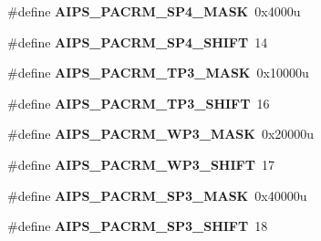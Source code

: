 \begin{DoxyCompactItemize}
\item 
\hypertarget{group___a_i_p_s___register___masks_ga14d029515875232b727e36844ecc8249}{}\#define {\bfseries A\+I\+P\+S\+\_\+\+P\+A\+C\+R\+M\+\_\+\+S\+P4\+\_\+\+M\+A\+S\+K}~0x4000u\label{group___a_i_p_s___register___masks_ga14d029515875232b727e36844ecc8249}

\item 
\hypertarget{group___a_i_p_s___register___masks_ga9fc76b0cb29d106a835ef7905978be39}{}\#define {\bfseries A\+I\+P\+S\+\_\+\+P\+A\+C\+R\+M\+\_\+\+S\+P4\+\_\+\+S\+H\+I\+F\+T}~14\label{group___a_i_p_s___register___masks_ga9fc76b0cb29d106a835ef7905978be39}

\item 
\hypertarget{group___a_i_p_s___register___masks_ga6d28a3c9779892919330279a33555751}{}\#define {\bfseries A\+I\+P\+S\+\_\+\+P\+A\+C\+R\+M\+\_\+\+T\+P3\+\_\+\+M\+A\+S\+K}~0x10000u\label{group___a_i_p_s___register___masks_ga6d28a3c9779892919330279a33555751}

\item 
\hypertarget{group___a_i_p_s___register___masks_gabfa8070a81960bcd605ec46272af76dd}{}\#define {\bfseries A\+I\+P\+S\+\_\+\+P\+A\+C\+R\+M\+\_\+\+T\+P3\+\_\+\+S\+H\+I\+F\+T}~16\label{group___a_i_p_s___register___masks_gabfa8070a81960bcd605ec46272af76dd}

\item 
\hypertarget{group___a_i_p_s___register___masks_gae951389caa46549b62841e9432e83f03}{}\#define {\bfseries A\+I\+P\+S\+\_\+\+P\+A\+C\+R\+M\+\_\+\+W\+P3\+\_\+\+M\+A\+S\+K}~0x20000u\label{group___a_i_p_s___register___masks_gae951389caa46549b62841e9432e83f03}

\item 
\hypertarget{group___a_i_p_s___register___masks_ga146dd3037916720c4f86c5ea5668379d}{}\#define {\bfseries A\+I\+P\+S\+\_\+\+P\+A\+C\+R\+M\+\_\+\+W\+P3\+\_\+\+S\+H\+I\+F\+T}~17\label{group___a_i_p_s___register___masks_ga146dd3037916720c4f86c5ea5668379d}

\item 
\hypertarget{group___a_i_p_s___register___masks_gac60a0419b4cba60bb36772a82aad04de}{}\#define {\bfseries A\+I\+P\+S\+\_\+\+P\+A\+C\+R\+M\+\_\+\+S\+P3\+\_\+\+M\+A\+S\+K}~0x40000u\label{group___a_i_p_s___register___masks_gac60a0419b4cba60bb36772a82aad04de}

\item 
\hypertarget{group___a_i_p_s___register___masks_ga5d793a831a5ea278d46d9cb639eae572}{}\#define {\bfseries A\+I\+P\+S\+\_\+\+P\+A\+C\+R\+M\+\_\+\+S\+P3\+\_\+\+S\+H\+I\+F\+T}~18\label{group___a_i_p_s___register___masks_ga5d793a831a5ea278d46d9cb639eae572}


\end{DoxyCompactItemize}
